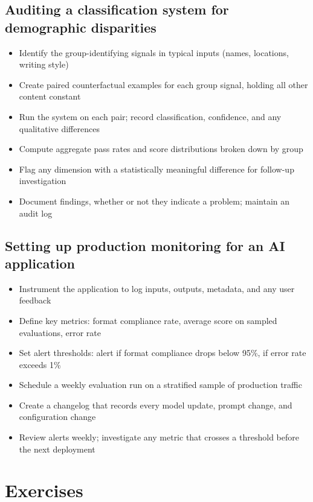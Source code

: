 \subsection{Auditing a classification system for demographic disparities}
\begin{itemize}[noitemsep,topsep=0pt]
  \item Identify the group-identifying signals in typical inputs (names, locations, writing style)
  \item Create paired counterfactual examples for each group signal, holding all other content constant
  \item Run the system on each pair; record classification, confidence, and any qualitative differences
  \item Compute aggregate pass rates and score distributions broken down by group
  \item Flag any dimension with a statistically meaningful difference for follow-up investigation
  \item Document findings, whether or not they indicate a problem; maintain an audit log
\end{itemize}

\subsection{Setting up production monitoring for an AI application}
\begin{itemize}[noitemsep,topsep=0pt]
  \item Instrument the application to log inputs, outputs, metadata, and any user feedback
  \item Define key metrics: format compliance rate, average score on sampled evaluations, error rate
  \item Set alert thresholds: alert if format compliance drops below 95\%, if error rate exceeds 1\%
  \item Schedule a weekly evaluation run on a stratified sample of production traffic
  \item Create a changelog that records every model update, prompt change, and configuration change
  \item Review alerts weekly; investigate any metric that crosses a threshold before the next deployment
\end{itemize}

\section{Exercises}

